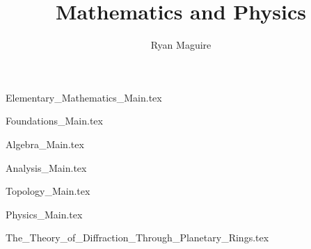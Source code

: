 \documentclass[crop=false,class=book,oneside]{standalone}                      %
\title{Mathematics and Physics}                                                %
\author{Ryan Maguire}                                                          %
\date{\vspace{-5ex}}                                                           %
\begin{document}
    \maketitle
    \tableofcontents
    \listoffigures
    \listoftables
    \clearpage
    \newif\ifmain
        
               {Elementary_Mathematics_Main.tex}

        {Foundations_Main.tex}

        {Algebra_Main.tex}
    
         {Analysis_Main.tex}

        {Topology_Main.tex}


        {Physics_Main.tex}

        
                {The_Theory_of_Diffraction_Through_Planetary_Rings.tex}

    \printglossary[type=\acronymtype]
    \clearpage
    \printglossary[style=long]
    \clearpage

    
\end{document}
